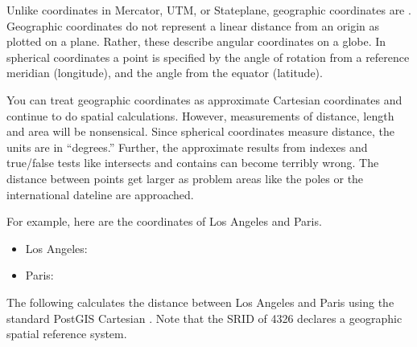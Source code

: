 \documentclass[a4paper,11pt,english]{sphinxmanual}
\begin{document}
Unlike coordinates in Mercator, UTM, or Stateplane, geographic coordinates are . Geographic coordinates do not represent a linear distance from an origin as plotted on a plane.  Rather, these  describe angular coordinates on a globe. In spherical coordinates a point is specified by the angle of rotation from a reference meridian (longitude), and the angle from the equator (latitude).

\noindent{}

You can treat geographic coordinates as approximate Cartesian coordinates and continue to do spatial calculations. However, measurements of distance, length and area will be nonsensical. Since spherical coordinates measure  distance, the units are in “degrees.” Further, the approximate results from indexes and true/false tests like intersects and contains can become terribly wrong. The distance between points get larger as problem areas like the poles or the international dateline are approached.

For example, here are the coordinates of Los Angeles and Paris.
\begin{itemize}
\item {} 
Los Angeles: 

\item {} 
Paris: 

\end{itemize}

The following calculates the distance between Los Angeles and Paris using the standard PostGIS Cartesian .  Note that the SRID of 4326 declares a geographic spatial reference system.

\begin{sphinxVerbatim}[commandchars=\\\{\}]
 
    
        
\end{sphinxVerbatim}
\end{document}
